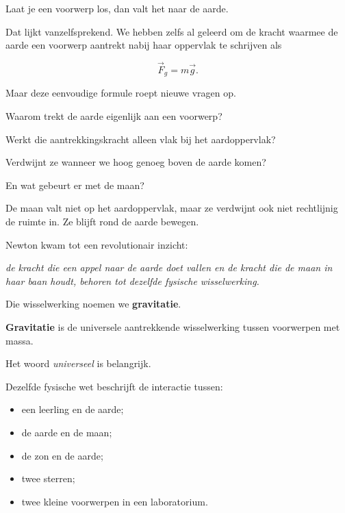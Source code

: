 \documentclass{ximera}
\begin{document}


Laat je een voorwerp los, dan valt het naar de aarde.

Dat lijkt vanzelfsprekend. We hebben zelfs al geleerd om de kracht
waarmee de aarde een voorwerp aantrekt nabij haar oppervlak te
schrijven als

\[
\vec F_g = m\vec g.
\]

Maar deze eenvoudige formule roept nieuwe vragen op.

Waarom trekt de aarde eigenlijk aan een voorwerp?

Werkt die aantrekkingskracht alleen vlak bij het aardoppervlak?

Verdwijnt ze wanneer we hoog genoeg boven de aarde komen?

En wat gebeurt er met de maan?

De maan valt niet op het aardoppervlak, maar ze verdwijnt ook niet
rechtlijnig de ruimte in. Ze blijft rond de aarde bewegen.

Newton kwam tot een revolutionair inzicht:

\begin{center}
\textit{de kracht die een appel naar de aarde doet vallen en de kracht
die de maan in haar baan houdt, behoren tot dezelfde fysische
wisselwerking.}
\end{center}

Die wisselwerking noemen we \textbf{gravitatie}.


\begin{definitie}[Gravitatie]

\textbf{Gravitatie} is de universele aantrekkende wisselwerking tussen
voorwerpen met massa.

\end{definitie}


Het woord \emph{universeel} is belangrijk.

Dezelfde fysische wet beschrijft de interactie tussen:

\begin{itemize}
  \item een leerling en de aarde;
  \item de aarde en de maan;
  \item de zon en de aarde;
  \item twee sterren;
  \item twee kleine voorwerpen in een laboratorium.
\end{itemize}
\end{document}
